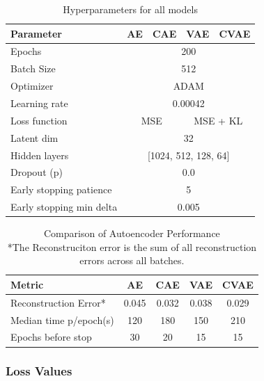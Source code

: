 \begin{table}[!htbp]
\centering
\begin{tabular}{@{}l*{4}{l}@{}}
\toprule
\textbf{Parameter} & \textbf{AE} & \textbf{CAE} & \textbf{VAE} & \textbf{CVAE}\\
\midrule
Epochs & \multicolumn{4}{c}{200} \\
Batch Size & \multicolumn{4}{c}{512} \\
Optimizer & \multicolumn{4}{c}{ADAM} \\
Learning rate & \multicolumn{4}{c}{0.00042} \\
Loss function & \multicolumn{2}{c}{MSE} & \multicolumn{2}{c}{MSE + KL} \\
Latent dim & \multicolumn{4}{c}{32} \\
Hidden layers & \multicolumn{4}{c}{[1024, 512, 128, 64]} \\
Dropout (p) & \multicolumn{4}{c}{0.0} \\
Early stopping patience & \multicolumn{4}{c}{5} \\
Early stopping min delta & \multicolumn{4}{c}{0.005} \\
\bottomrule
\end{tabular}
\caption{Hyperparameters for all models}
\label{tab:hyperparameters}
\end{table}


\begin{table}[!htbp]
    \centering
    \begin{tabular}{lcccc}
        \hline
        \textbf{Metric} & \textbf{AE} & \textbf{CAE} & \textbf{VAE} & \textbf{CVAE} \\
        \hline
        Reconstruction Error* & 0.045 & 0.032 & 0.038 & 0.029 \\
        Median time p/epoch(s) & 120 & 180 & 150 & 210 \\
        Epochs before stop & 30 & 20 & 15 & 15 \\
        \hline
    \end{tabular}
    \caption{Comparison of Autoencoder Performance\\ *The Reconstruciton error is the sum of all reconstruction errors across all batches.}
    \label{tab:autoencoder_comparison}
\end{table}


\subsubsection{Loss Values}

